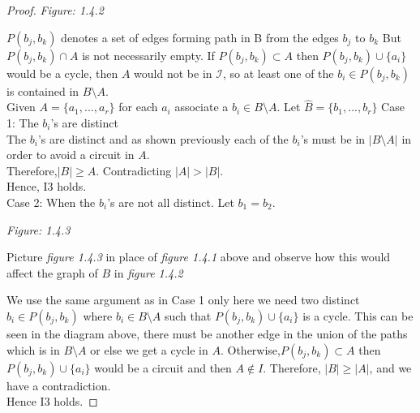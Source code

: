 \documentclass[../main.tex]{subfiles}
\begin{document}
\begin{proof}
\begin{minipage}{.2\textwidth}
\textit{Figure: 1.4.2}
 \end{minipage}
 
 \vspace{2mm}
 
 \noindent\Notation $P( b_j, b_k )$ denotes a set of edges forming path in B from the edges $ b_j $ to $ b_k $
\noindent But $ P(b_j,b_k) \cap A $ is not necessarily empty. If $P(b_j,b_k) \subset A$ then $P(b_j,b_k) \cup \{ a_i \}$  would be a cycle, then $A$ would not be in $\mathcal{I}$, so at least one of the $b_i \in P(b_j,b_k)$ is contained in $B \setminus A.$\\
\noindent Given $A = \{a_1, ... ,a_r\} $ for each $a_i$ associate a $b_i \in B \setminus A$. Let $\hat{B} = \{b_1, ... ,b_r\}$ 
\noindent Case 1: The $ b_i$'s are distinct\\
 The $b_i$'s are distinct and as shown previously each of the $b_i$'s must be in $|B \setminus A|$ in order to avoid a circuit in $A$.\\ 
\noindent Therefore,$|B| \geqslant A$. Contradicting $|A|>|B|.$\\
\noindent Hence, I3 holds.\\
\noindent Case 2: When the $b_i$'s are not all distinct.
\noindent Let $ b_1 = b_2 $.

\vspace{3mm}

\begin{minipage}{.2\textwidth}
\textit{Figure: 1.4.3}
\end{minipage}
\hspace{2.5cm} \begin{minipage}{.6\textwidth}
Picture \textit{figure 1.4.3} in place of \textit{figure 1.4.1} above and observe how this would affect the graph of $B$ in \textit{figure 1.4.2}
 \end{minipage}
\noindent We use the same argument as in Case 1 only here we need two distinct $b_i \in P( b_j, b_k)$ where $b_i \in B \setminus A$ such that  $P(b_j , b_k ) \cup \{ a_i \}$ is a cycle. This can be seen in the diagram above, there must be another edge in the union of the paths which is in $B \setminus A$ or else we get a cycle in $A.$ Otherwise,$P(b_j,b_k) \subset A$ then $P(b_j,b_k) \cup \{ a_i \}$  would be a circuit and then $A \notin I.$ Therefore, $|B| \geq |A|$, and we have a contradiction.\\
\noindent Hence I3 holds.
\end{proof}
 
\end{document}
